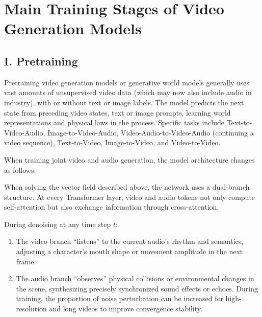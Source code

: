 \setcounter{section}{1}

\hypertarget{main-training-stages-of-video-generation-models}{%
\section{Main Training Stages of Video Generation Models}\label{main-training-stages-of-video-generation-models}}

\hypertarget{i.-pretraining}{%
\subsection{I. Pretraining}\label{i.-pretraining}}

Pretraining video generation models or generative world models generally uses vast amounts of unsupervised video data (which may now also include audio in industry), with or without text or image labels. The model predicts the next state from preceding video states, text or image prompts, learning world representations and physical laws in the process. Specific tasks include Text-to-Video-Audio, Image-to-Video-Audio, Video-Audio-to-Video-Audio (continuing a video sequence), Text-to-Video, Image-to-Video, and Video-to-Video.

When training joint video and audio generation, the model architecture changes as follows:

When solving the vector field described above, the network uses a dual-branch structure. At every Transformer layer, video and audio tokens not only compute self-attention but also exchange information through cross-attention.

During denoising at any time step \(t\):

\begin{enumerate}
\def\labelenumi{\arabic{enumi}.}
\item
  The video branch ``listens'' to the current audio's rhythm and semantics, adjusting a character's mouth shape or movement amplitude in the next frame.
\item
  The audio branch ``observes'' physical collisions or environmental changes in the scene, synthesizing precisely synchronized sound effects or echoes.
  During training, the proportion of noise perturbation can be increased for high-resolution and long videos to improve convergence stability.
\end{enumerate}

